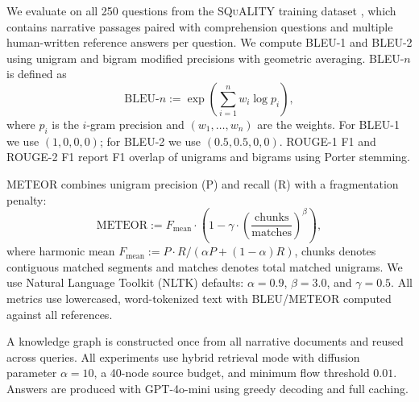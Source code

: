 \documentclass{article} %
\begin{document}
{
We evaluate on all 250 questions from the \textsc{SQuALITY} training dataset \citep{wang2022squality}, which contains narrative passages paired with comprehension questions and multiple human-written reference answers per question.
We compute BLEU-1 and BLEU-2 using unigram and bigram modified precisions with geometric averaging. BLEU-$n$ is defined as
\[
\text{BLEU-}n := \exp\!\left( \sum_{i=1}^{n} w_i \log p_i \right),
\]
where $p_i$ is the $i$-gram precision and $(w_1,\ldots,w_n)$ are the weights. For BLEU-1 we use $(1,0,0,0)$; for BLEU-2 we use $(0.5,0.5,0,0)$. ROUGE-1 F1 and ROUGE-2 F1 report F1 overlap of unigrams and bigrams using Porter stemming. 

METEOR combines unigram precision (P) and recall (R) with a fragmentation penalty:
$$\text{METEOR} := F_{\text{mean}} \cdot \left(1 - \gamma \cdot \left(\frac{\text{chunks}}{\text{matches}}\right)^\beta\right),$$
where harmonic mean $F_{\text{mean}} := P \cdot R/(\alpha P + (1-\alpha)R)$, chunks denotes contiguous matched segments and matches denotes total matched unigrams. We use Natural Language Toolkit (NLTK) defaults: $\alpha=0.9$, $\beta=3.0$, and $\gamma=0.5$. All metrics use lowercased, word-tokenized text with BLEU/METEOR computed against all references.

A knowledge graph is constructed once from all narrative documents and reused across queries. All experiments use hybrid retrieval mode with diffusion parameter $\alpha=10$, a 40-node source budget, and minimum flow threshold $0.01$. Answers are produced with GPT-4o-mini using greedy decoding and full caching. 
}






\end{document}
